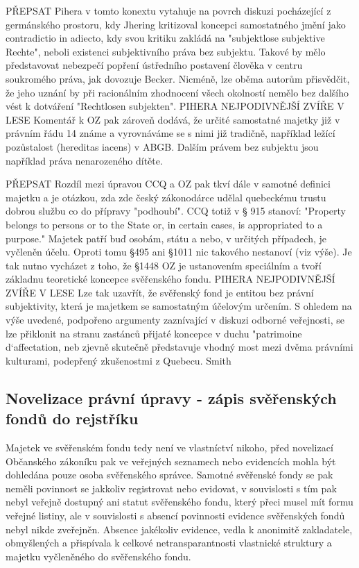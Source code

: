 \documentclass{article}
\begin{document}
PŘEPSAT
Pihera v tomto konextu vytahuje na povrch diskuzi pocházející z germánského prostoru, kdy Jhering kritizoval koncepci samostatného jmění jako contradictio in adiecto, kdy svou kritiku zakládá na "subjektlose subjektive Rechte", neboli existenci subjektivního práva bez subjektu. Takové by mělo představovat nebezpečí popření ústředního postavení člověka v centru soukromého práva, jak dovozuje Becker. Nicméně, lze oběma autorům přisvědčit, že jeho uznání by při racionálním zhodnocení všech okolností nemělo bez dalšího vést k dotváření "Rechtlosen subjekten". PIHERA NEJPODIVNĚJŠÍ ZVÍŘE V LESE Komentář k OZ pak zároveň dodává, že určité samostatné majetky již v právním řádu 14 známe a vyrovnáváme se s nimi již tradičně, například ležící pozůstalost (hereditas iacens) v ABGB. Dalším právem bez subjektu jsou například práva nenarozeného dítěte.

PŘEPSAT
Rozdíl mezi úpravou CCQ a OZ pak tkví dále v samotné definici majetku a je otázkou, zda zde český zákonodárce udělal quebeckému trustu dobrou službu co do přípravy "podhoubí". CCQ totiž v § 915 stanoví: "Property belongs to persons or to the State or, in certain cases, is appropriated to a purpose." Majetek patří buď osobám, státu a nebo, v určitých případech, je vyčleněn účelu. Oproti tomu §495 ani §1011 nic takového nestanoví (viz výše). Je tak nutno vycházet z toho, že §1448 OZ je ustanovením speciálním a tvoří základnu teoretické koncepce svěřenského fondu. PIHERA NEJPODIVNĚJŠÍ ZVÍŘE V LESE Lze tak uzavřít, že svěřenský fond je entitou bez právní subjektivity, která je majetkem se samostatným účelovým určením. S ohledem na výše uvedené, podpořeno argumenty zaznívající v diskuzi odborné veřejnosti, se lze přiklonit na stranu zastánců přijaté koncepce v duchu "patrimoine d`affectation, neb zjevně skutečně představuje vhodný most mezi dvěma právními kulturami, podepřený zkušenostmi z Quebecu. Smith

\subsection{Novelizace právní úpravy - zápis svěřenských fondů do rejstříku}

Majetek ve svěřenském fondu tedy není ve vlastníctví nikoho, před novelizací Občanského zákoníku pak ve veřejných seznamech nebo evidencích mohla být dohledána pouze osoba svěřenského správce. Samotné svěřenské fondy se pak neměli povinnost se jakkoliv registrovat nebo evidovat, v souvislosti s tím pak nebyl veřejně dostupný ani statut svěřenského fondu, který přeci musel mít formu veřejné listiny, ale v souvislosti s absencí povinnosti evidence svěřenských fondů nebyl nikde zveřejněn. Absence jakékoliv evidence, vedla k anonimitě zakladatele, obmyšlených a přispívala k celkové netransparantnosti vlastnické struktury a majetku vyčleněného do svěřenského fondu.\\
\end{document}
